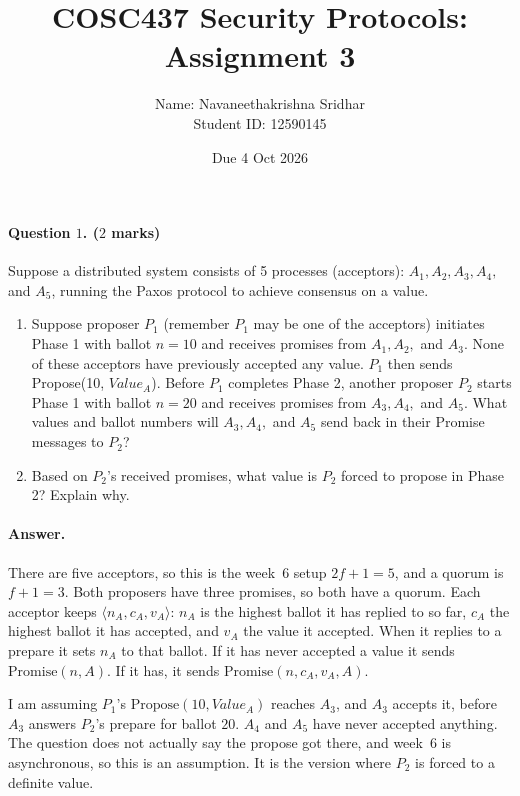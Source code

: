 \documentclass{article}
\title{COSC437 Security Protocols: Assignment 3}
\author{Name: Navaneethakrishna Sridhar \\ Student ID: 12590145}
\date{Due 4 Oct 2026}
\newcommand{\tuple}[1]{\langle #1\rangle}
\begin{document}
\maketitle

\paragraph{Question $1$. ($2$ marks)}
Suppose a distributed system consists of 5 processes (acceptors): $A_1, A_2, A_3, A_4,$ and $A_5$, running the Paxos protocol to achieve consensus on a value.
\begin{enumerate}
    \item Suppose proposer $P_1$ (remember $P_1$ may be one of the acceptors) initiates Phase 1 with ballot $n = 10$ and receives promises from $A_1, A_2,$ and $A_3$. None of these acceptors have previously accepted any value. $P_1$ then sends Propose(10, $Value_A$). Before $P_1$ completes Phase 2, another proposer $P_2$ starts Phase 1 with ballot $n = 20$ and receives promises from $A_3, A_4,$ and $A_5$. What values and ballot numbers will $A_3, A_4,$ and $A_5$ send back in their Promise messages to $P_2$? 
    \item Based on $P_2$'s received promises, what value is $P_2$ forced to propose in Phase 2? Explain why.
\end{enumerate}

\paragraph{Answer.}
There are five acceptors, so this is the week~6 setup $2f+1 = 5$, and a quorum is $f+1 = 3$. Both proposers have three promises, so both have a quorum. Each acceptor keeps $\tuple{n_A, c_A, v_A}$: $n_A$ is the highest ballot it has replied to so far, $c_A$ the highest ballot it has accepted, and $v_A$ the value it accepted. When it replies to a prepare it sets $n_A$ to that ballot. If it has never accepted a value it sends $\mathrm{Promise}(n, A)$. If it has, it sends $\mathrm{Promise}(n, c_A, v_A, A)$.

I am assuming $P_1$'s $\mathrm{Propose}(10, Value_A)$ reaches $A_3$, and $A_3$ accepts it, before $A_3$ answers $P_2$'s prepare for ballot $20$. $A_4$ and $A_5$ have never accepted anything. The question does not actually say the propose got there, and week~6 is asynchronous, so this is an assumption. It is the version where $P_2$ is forced to a definite value.
\end{document}
